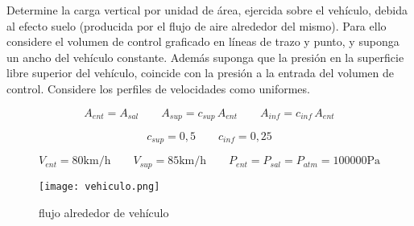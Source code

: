 \item Determine la carga vertical por unidad de área, ejercida sobre el vehículo, debida al efecto suelo (producida por el flujo de aire alrededor del mismo). Para ello considere el volumen de control graficado en líneas de trazo y punto, y suponga un ancho del vehículo constante. Además suponga que la presión en la superficie libre superior del vehículo, coincide con la presión a la entrada del volumen de control. Considere los perfiles de velocidades como uniformes.

$$A_{ent} = A_{sal} \qquad A_{sup} = c_{sup}\,A_{ent} \qquad A_{inf} = c_{inf}\,A_{ent} $$

$$c_{sup} = 0,5 \qquad c_{inf} = 0,25$$

$$V_{ent} = 80 \text{km/h} \qquad V_{sup}=85 \text{km/h} \qquad P_{ent} = P_{sal} = P_{atm} = 100000\text{Pa}$$

\begin{figure}[h]
\centering
\texttt{[image: vehiculo.png]}
\caption{flujo alrededor de vehículo}
\label{fig:vehiculo}
\end{figure}

